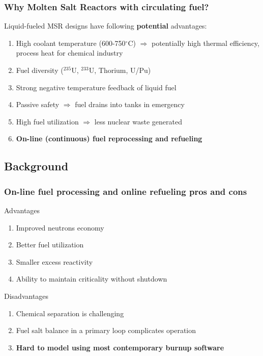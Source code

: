 \begin{frame}
\frametitle{Why Molten Salt Reactors with circulating fuel?}
\begin{block}{Liquid-fueled \gls{MSR} designs have following \textbf{potential} advantages:}
	\begin{enumerate}
		\itemsep1em
		\item High coolant temperature (600-750$^{\circ}$C) 
		$\Rightarrow$ potentially high thermal efficiency, process 
		heat for chemical industry
		\item Fuel diversity ($^{235}$U, $^{233}$U, Thorium, U/Pu)
		\item Strong negative temperature feedback of liquid fuel
		\item Passive safety $\Rightarrow$ fuel drains into tanks 
		in emergency
		\item High fuel utilization $\Rightarrow$ less nuclear 
		waste generated
		\item<2> \textbf{On-line (continuous) fuel reprocessing and refueling}
	\end{enumerate}
\end{block}

\end{frame}


\subsection{Background}


\begin{frame}
\frametitle{On-line fuel processing and online refueling pros and cons}
\begin{block}{Advantages}
	\begin{enumerate}
		\item Improved neutrons economy
		\item Better fuel utilization
		\item Smaller excess reactivity
		\item Ability to maintain criticality without shutdown
	\end{enumerate}
\end{block}

\begin{block}{Disadvantages}
	\begin{enumerate}
		\item Chemical separation is challenging
		\item Fuel salt balance in a primary loop complicates operation
		\item \textbf{Hard to model using most contemporary burnup software}
	\end{enumerate}
\end{block}

\end{frame}


